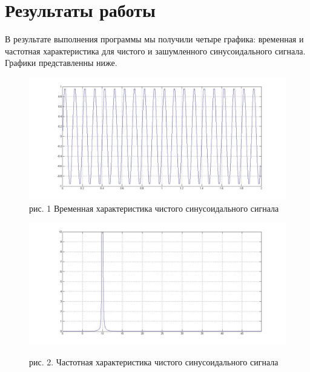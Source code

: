 \documentclass[10pt,a4paper]{report}
\begin{document}
\section{Результаты работы}
В результате выполнения программы мы получили четыре графика: временная и частотная характеристика для чистого и зашумленного синусоидального сигнала. Графики представленны ниже. \newpage
\begin{figure}
\begin{center}
\includegraphics[angle=0, scale = 0.3]{sint.jpg}
рис. 1 Временная характеристика чистого синусоидального сигнала
\end{center}
\begin{center}
\includegraphics[angle=0, scale = 0.3]{sinch.jpg}
\end{center}
рис. 2. Частотная характеристика чистого синусоидального сигнала
\end{figure}
\end{document}
